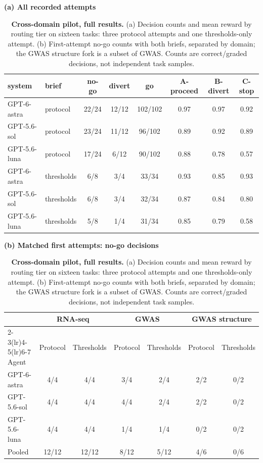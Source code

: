 \begin{table}[t]
\centering
\small
\caption{\textbf{Cross-domain pilot, full results.} (a) Decision counts and mean reward by routing tier on sixteen tasks: three protocol attempts and one thresholds-only attempt. (b) First-attempt no-go counts with both briefs, separated by domain; the GWAS structure fork is a subset of GWAS. Counts are correct/graded decisions, not independent task samples.}
\label{tab:portability}
\textbf{(a) All recorded attempts}\par\smallskip
\begin{tabular}{llcccccc}
\toprule
system & brief & no-go & divert & go & A-proceed & B-divert & C-stop \\
\midrule
GPT-6-astra & protocol & 22/24 & 12/12 & 102/102 & 0.97 & 0.97 & 0.92 \\
GPT-5.6-sol & protocol & 23/24 & 11/12 & 96/102 & 0.89 & 0.92 & 0.89 \\
GPT-5.6-luna & protocol & 17/24 & 6/12 & 90/102 & 0.88 & 0.78 & 0.57 \\
GPT-6-astra & thresholds & 6/8 & 3/4 & 33/34 & 0.93 & 0.85 & 0.93 \\
GPT-5.6-sol & thresholds & 6/8 & 3/4 & 32/34 & 0.87 & 0.84 & 0.80 \\
GPT-5.6-luna & thresholds & 5/8 & 1/4 & 31/34 & 0.85 & 0.79 & 0.58 \\
\bottomrule
\end{tabular}
\par\medskip
\textbf{(b) Matched first attempts: no-go decisions}\par\smallskip
\begin{tabular}{lcccccc}
\toprule
& \multicolumn{2}{c}{RNA-seq} & \multicolumn{2}{c}{GWAS} & \multicolumn{2}{c}{GWAS structure} \\
\cmidrule(lr){2-3}\cmidrule(lr){4-5}\cmidrule(lr){6-7}
Agent & Protocol & Thresholds & Protocol & Thresholds & Protocol & Thresholds \\
\midrule
GPT-6-astra & 4/4 & 4/4 & 3/4 & 2/4 & 2/2 & 0/2 \\
GPT-5.6-sol & 4/4 & 4/4 & 4/4 & 2/4 & 2/2 & 0/2 \\
GPT-5.6-luna & 4/4 & 4/4 & 1/4 & 1/4 & 0/2 & 0/2 \\
\midrule
Pooled & 12/12 & 12/12 & 8/12 & 5/12 & 4/6 & 0/6 \\
\bottomrule
\end{tabular}
\end{table}
